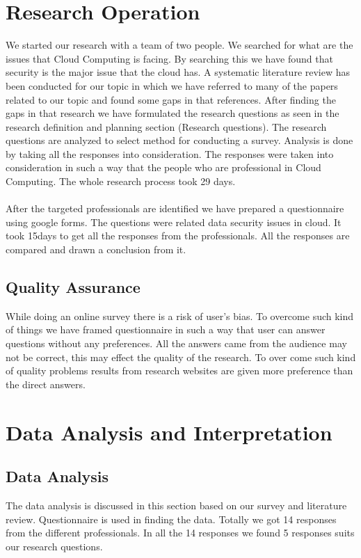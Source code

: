 \section{Research Operation}
We started our research with a team of two people. We searched for what are the issues that Cloud Computing is facing. By searching this we have found that security is the major issue that the cloud has. A systematic literature review has been conducted for our topic in which we have referred to many of the papers related to our topic and found some gaps in that references. After finding the gaps in that research we have formulated the research questions as seen in the research definition and planning section (Research questions). The research questions are analyzed to select method for conducting a survey. Analysis is done by taking all the responses into consideration. The responses were taken into consideration in such a way that the people who are professional in Cloud Computing. The whole research process took 29 days.
\paragraph{}
After the targeted professionals are identified we have prepared a questionnaire using google forms. The questions were related data security issues in cloud. It took 15days to get all the responses from the professionals. All the responses are compared and drawn a conclusion from it.


\subsection{Quality Assurance}

While doing an online survey there is a risk of user’s bias. To overcome such kind of things we have framed questionnaire in such a way that user can answer questions without any preferences. All the answers came from the audience may not be correct, this may effect the quality of the research. To over come such kind of quality problems results from research websites are given more preference than the direct answers.

\section{Data Analysis and Interpretation}
\subsection{Data Analysis}
The data analysis is discussed in this section based on our survey and literature review. Questionnaire is used in finding the data. Totally we got 14 responses from the different professionals. In all the 14 responses we found 5 responses suits our research questions.
